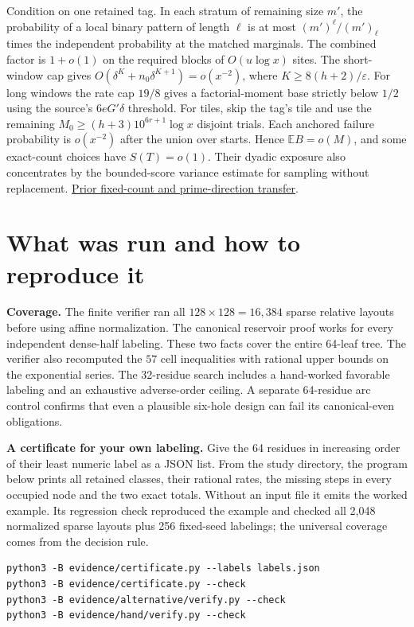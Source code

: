 \documentclass[12pt,letterpaper]{article}
\newcommand{\pagepart}[1]{\clearpage\section{#1}}
\begin{document}
Condition on one retained tag. In each stratum of remaining size \(m'\), the probability of a local binary pattern of length \(\ell\) is at most \((m')^\ell/(m')_\ell\) times the independent probability at the matched marginals. The combined factor is \(1+o(1)\) on the required blocks of \(O(u\log x)\) sites. The short-window cap gives \(O(\delta^{K}+n_0\delta^{K+1})=o(x^{-2})\), where \(K\ge8(h+2)/\varepsilon\). For long windows the rate cap \(19/8\) gives a factorial-moment base strictly below \(1/2\) using the source's \(6eG'\delta\) threshold. For tiles, skip the tag's tile and use the remaining \(M_0\ge(h+3)10^{6r+1}\log x\) disjoint trials. Each anchored failure probability is \(o(x^{-2})\) after the union over starts. Hence \(\mathbb E B=o(M)\), and some exact-count choices have \(S(T)=o(1)\). Their dyadic exposure also concentrates by the bounded-score variance estimate for sampling without replacement. \href{https://github.com/nousentllc/riemann-hypothesis/blob/f667dea291ef2a5b204810ad63611ef6b718b18a/research/uriel/experiments/recovery-frontier/evidence/profiles/AUDIT.md}{Prior fixed-count and prime-direction transfer}.

\pagepart{What was run and how to reproduce it}
\textbf{Coverage.} The finite verifier ran all \(128\times128=16{,}384\) sparse relative layouts before using affine normalization. The canonical reservoir proof works for every independent dense-half labeling. These two facts cover the entire 64-leaf tree. The verifier also recomputed the \(57\) cell inequalities with rational upper bounds on the exponential series. The 32-residue search includes a hand-worked favorable labeling and an exhaustive adverse-order ceiling. A separate 64-residue arc control confirms that even a plausible six-hole design can fail its canonical-even obligations.

\textbf{A certificate for your own labeling.} Give the 64 residues in increasing order of their least numeric label as a JSON list. From the study directory, the program below prints all retained classes, their rational rates, the missing steps in every occupied node and the two exact totals. Without an input file it emits the worked example. Its regression check reproduced the example and checked all 2,048 normalized sparse layouts plus 256 fixed-seed labelings; the universal coverage comes from the decision rule.
\begin{verbatim}
python3 -B evidence/certificate.py --labels labels.json
python3 -B evidence/certificate.py --check
python3 -B evidence/alternative/verify.py --check
python3 -B evidence/hand/verify.py --check
\end{verbatim}
\end{document}
